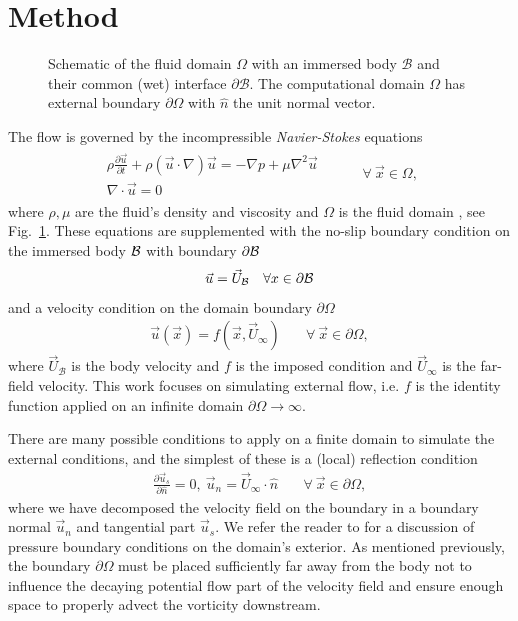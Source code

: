 \documentclass[11pt]{article}
\begin{document}
\section{Method}

\begin{figure}
    \centering
    \def\svgwidth{0.5\columnwidth}
    
    \caption{Schematic of the fluid domain $\Omega$ with an immersed body $\mathcal{B}$ and their common (wet) interface $\partial\mathcal{B}$. The computational domain $\Omega$ has external boundary $\partial\Omega$ with $\hat{n}$ the unit normal vector.}
    \label{Fig_1}
\end{figure}

\noindent The flow is governed by the incompressible \emph{Navier-Stokes} equations
\begin{align}
    \begin{array}{c}
     \rho\frac{\partial\vec{u}}{\partial t} +\rho\left(\vec{u}\cdot\nabla\right)\vec{u} = -\nabla p + \mu\nabla^2\vec{u}\\
    \nabla\cdot\vec{u}=0  
    \end{array}
 & \quad\quad\forall\ \vec{x}\in\Omega,
\end{align}
where $\rho,\mu$ are the fluid's density and viscosity and $\Omega$ is the fluid domain , see Fig.~\ref{Fig_1}. These equations are supplemented with the no-slip boundary condition on the immersed body $\cal B$ with boundary $\partial\cal{B}$
\begin{equation}
    \vec{u} = \vec{U}_\mathcal{B} \quad \forall x \in \partial\cal{B}
\end{equation} 
and a velocity condition on the domain boundary $\partial\Omega$
\begin{align}
    \vec u(\vec x) = f(\vec x,\vec U_\infty) &\quad\forall\ \vec{x}\in\partial\Omega,
\end{align}
where $\vec{U}_\mathcal{B}$ is the body velocity and $f$ is the imposed condition and $\vec U_\infty$ is the far-field velocity. This work focuses on simulating external flow, i.e. $f$ is the identity function applied on an infinite domain $\partial\Omega\rightarrow\infty$.

There are many possible conditions to apply on a finite domain to simulate the external conditions, and the simplest of these is a (local) reflection condition
\begin{align}\label{eq:BC_0}
    \frac{\partial \vec{u}_s}{\partial \hat{n}} = 0,\ \vec{u}_n = \vec U_\infty\cdot \hat n &\quad\forall\ \vec{x}\in\partial\Omega,
\end{align}
where we have decomposed the velocity field on the boundary in a boundary normal $\vec{u}_n$ and tangential part $\vec{u}_s$. We refer the reader to \cite{Gresho1987} for a discussion of pressure boundary conditions on the domain's exterior.  As mentioned previously, the boundary $\partial\Omega$ must be placed sufficiently far away from the body not to influence the decaying potential flow part of the velocity field and ensure enough space to properly advect the vorticity downstream. 
\end{document}
